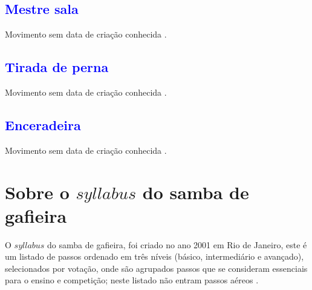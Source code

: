 \subsection{\textcolor{blue}{Mestre sala}}
Movimento sem data de criação conhecida \cite[pp. 144]{perna2002samba}.

\subsection{\textcolor{blue}{Tirada de perna}}
Movimento sem data de criação conhecida \cite[pp. 144]{perna2002samba}.

\subsection{\textcolor{blue}{Enceradeira}}
Movimento sem data de criação conhecida \cite[pp. 144]{perna2002samba}.

\section{Sobre o $syllabus$ do samba de gafieira}

O $syllabus$  do samba de gafieira, foi criado no ano 2001 em Rio de Janeiro,
este é um listado de passos ordenado em três níveis (básico, intermediário e avançado),
selecionados por votação,
onde são agrupados passos que se consideram essenciais para o ensino e competição;
neste listado não entram passos aéreos \cite[pp. 144]{perna2002samba}.


